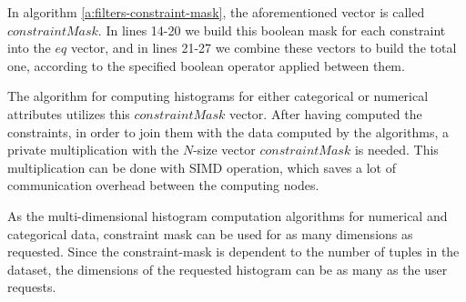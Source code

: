 In algorithm \ref{a:filters-constraint-mask}, the aforementioned vector is called $constraintMask$.
In lines 14-20 we build this boolean mask for each constraint into the $eq$ vector, and in lines 21-27 we combine these vectors to build the total one, according to the specified boolean operator applied between them.

The algorithm for computing histograms for either categorical or numerical attributes utilizes this $constraintMask$ vector.
After having computed the constraints, in order to join them with the data computed by the algorithms, a private multiplication with the $N$-size vector $constraintMask$ is needed.
This multiplication can be done with SIMD operation, which saves a lot of communication overhead between the computing nodes.

As the multi\hyp dimensional histogram computation algorithms for numerical and categorical data, constraint mask can be used for as many dimensions as requested.
Since the constraint\hyp mask is dependent to the number of tuples in the dataset, the dimensions of the requested histogram can be as many as the user requests.




